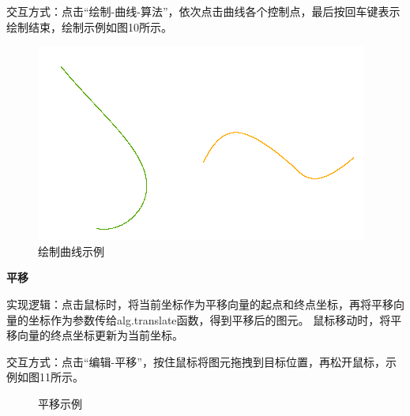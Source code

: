 \documentclass[a4paper,UTF8]{article}
\begin{document}
交互方式：点击“绘制-曲线-算法”，依次点击曲线各个控制点，最后按回车键表示绘制结束，绘制示例如图10所示。
\begin{figure}[H]
    \centering
    \includegraphics[scale=0.8]{draw-curve.PNG}
    \caption{绘制曲线示例}
\end{figure}

\textbf{平移}

实现逻辑：点击鼠标时，将当前坐标作为平移向量的起点和终点坐标，再将平移向量的坐标作为参数传给alg.translate函数，得到平移后的图元。
鼠标移动时，将平移向量的终点坐标更新为当前坐标。

交互方式：点击“编辑-平移”，按住鼠标将图元拖拽到目标位置，再松开鼠标，示例如图11所示。
\begin{figure}[H]
    \centering
        \caption{平移示例}
\end{figure}
\end{document}
